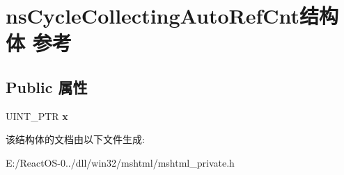 \hypertarget{structns_cycle_collecting_auto_ref_cnt}{}\section{ns\+Cycle\+Collecting\+Auto\+Ref\+Cnt结构体 参考}
\label{structns_cycle_collecting_auto_ref_cnt}
\subsection*{Public 属性}
\begin{DoxyCompactItemize}
\item 
\mbox{\label{structns_cycle_collecting_auto_ref_cnt_a45ea4c35a21ed68b318e17a966542ed6}} 
U\+I\+N\+T\+\_\+\+P\+TR {\bfseries x}
\end{DoxyCompactItemize}


该结构体的文档由以下文件生成\+:\begin{DoxyCompactItemize}
\item 
E\+:/\+React\+O\+S-\/0../dll/win32/mshtml/mshtml\+\_\+private.\+h\end{DoxyCompactItemize}
